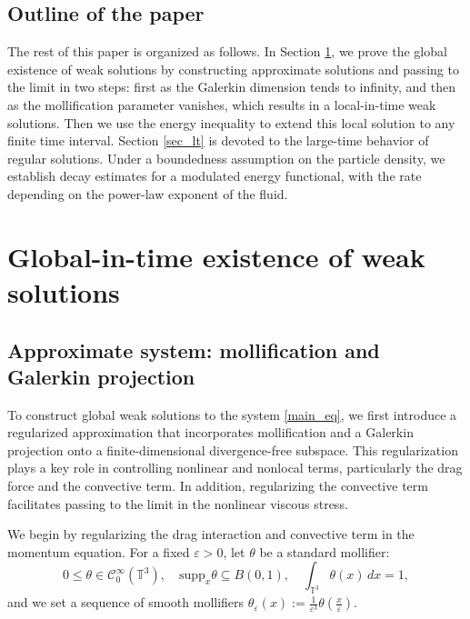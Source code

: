 \documentclass[10pt,reqno]{amsart}
\numberwithin{equation}{section}
\newcommand{\T}{\mathbb T}
\newcommand{\mc}{\mathcal C}
\newcommand{\e}{\varepsilon}
\begin{document}
\subsection{Outline of the paper}
The rest of this paper is organized as follows. In Section \ref{sec_gw}, we prove the global existence of weak solutions by constructing approximate solutions and passing to the limit in two steps: first as the Galerkin dimension tends to infinity, and then as the mollification parameter vanishes, which results in a local-in-time weak solutions. Then we use the energy inequality to extend this local solution to any finite time interval. Section \ref{sec_lt} is devoted to the large-time behavior of regular solutions. Under a boundedness assumption on the particle density, we establish decay estimates for a modulated energy functional, with the rate depending on the power-law exponent of the fluid.


 
%
%
% 
%
%
\section{Global-in-time existence of weak solutions}\label{sec_gw}
%
%
% 
%
%
\subsection{Approximate system: mollification and Galerkin projection}
To construct global weak solutions to the system \eqref{main_eq}, we first introduce a regularized approximation that incorporates mollification and a Galerkin projection onto a finite-dimensional divergence-free subspace. This regularization plays a key role in controlling nonlinear and nonlocal terms, particularly the drag force and the convective term. In addition, regularizing the convective term facilitates passing to the limit in the nonlinear viscous stress.


We begin by regularizing the drag interaction and convective term in the momentum equation. For a fixed $\e > 0$, let $\theta$ be a standard mollifier:
\[
0 \leq \theta \in \mc^\infty_0(\T^3), \quad \mbox{supp}_x\theta \subseteq B(0,1), \quad \int_{\T^3} \theta(x)\,dx = 1,
\]
and we set a sequence of smooth mollifiers $\theta_\e(x) := \frac{1}{\e^3}\theta(\frac x\e)$.
\end{document}
